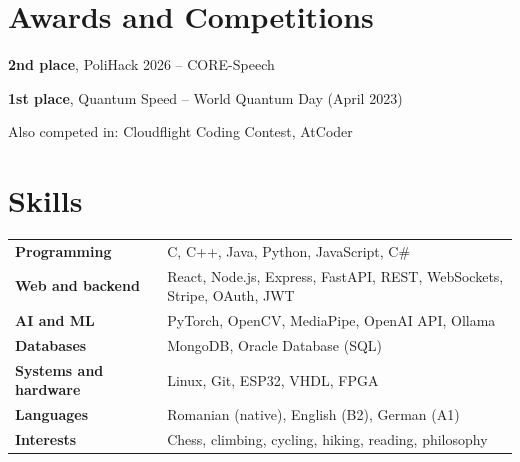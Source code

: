 \documentclass[a4paper,11pt]{article}
\begin{document}
\section{Awards and Competitions}
\begin{bullets}
\item \textbf{2nd place}, PoliHack 2026 -- CORE-Speech
\item \textbf{1st place}, Quantum Speed -- World Quantum Day (April 2023)
\item Also competed in: Cloudflight Coding Contest, AtCoder
\end{bullets}

\section{Skills}
\begin{tabularx}{\linewidth}{@{}l X@{}}
\textbf{Programming} & C, C++, Java, Python, JavaScript, C\# \\
\textbf{Web and backend} & React, Node.js, Express, FastAPI, REST, WebSockets, Stripe, OAuth, JWT \\
\textbf{AI and ML} & PyTorch, OpenCV, MediaPipe, OpenAI API, Ollama \\
\textbf{Databases} & MongoDB, Oracle Database (SQL) \\
\textbf{Systems and hardware} & Linux, Git, ESP32, VHDL, FPGA \\
\textbf{Languages} & Romanian (native), English (B2), German (A1) \\
\textbf{Interests} & Chess, climbing, cycling, hiking, reading, philosophy \\
\end{tabularx}
\end{document}
